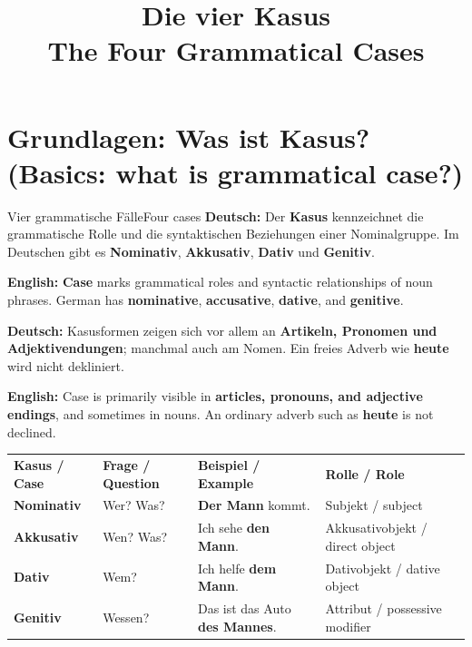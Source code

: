 \documentclass[a4paper,11pt]{article}
\title{Die vier Kasus\\\large\textnormal{The Four Grammatical Cases}}
\date{}
\newcommand{\GermanText}[1]{\textbf{Deutsch: }#1\par}
\newcommand{\EnglishText}[1]{{\small\color{SoftGray}\textbf{English: }#1\par}}
\begin{document}
    \maketitle
    
    
    \tableofcontents
    \newpage

    \section{Grundlagen: Was ist Kasus? \textnormal{(Basics: what is grammatical case?)}}
        \begin{grammarentry}{Vier grammatische Fälle}{Four cases}
            \GermanText{Der \textbf{Kasus} kennzeichnet die grammatische Rolle und die syntaktischen Beziehungen einer Nominalgruppe. Im Deutschen gibt es \textbf{Nominativ}, \textbf{Akkusativ}, \textbf{Dativ} und \textbf{Genitiv}.}
            \EnglishText{\textbf{Case} marks grammatical roles and syntactic relationships of noun phrases. German has \textbf{nominative}, \textbf{accusative}, \textbf{dative}, and \textbf{genitive}.}
            \GermanText{Kasusformen zeigen sich vor allem an \textbf{Artikeln, Pronomen und Adjektivendungen}; manchmal auch am Nomen. Ein freies Adverb wie \textbf{heute} wird nicht dekliniert.}
            \EnglishText{Case is primarily visible in \textbf{articles, pronouns, and adjective endings}, and sometimes in nouns. An ordinary adverb such as \textbf{heute} is not declined.}
        \end{grammarentry}

        \begin{longtable}{>{\bfseries}p{2.7cm}|p{2.5cm}|p{5.1cm}|p{4cm}}
            \rowcolor{HeaderBlueDark}
            \color{white}\textbf{Kasus / Case} &
            \color{white}\textbf{Frage / Question} &
            \color{white}\textbf{Beispiel / Example} &
            \color{white}\textbf{Rolle / Role}\\
            Nominativ & Wer? Was? & \textbf{Der Mann} kommt. & Subjekt / subject\\
            Akkusativ & Wen? Was? & Ich sehe \textbf{den Mann}. & Akkusativobjekt / direct object\\
            Dativ & Wem? & Ich helfe \textbf{dem Mann}. & Dativobjekt / dative object\\
            Genitiv & Wessen? & Das ist das Auto \textbf{des Mannes}. & Attribut / possessive modifier\\
        \end{longtable}
\end{document}
